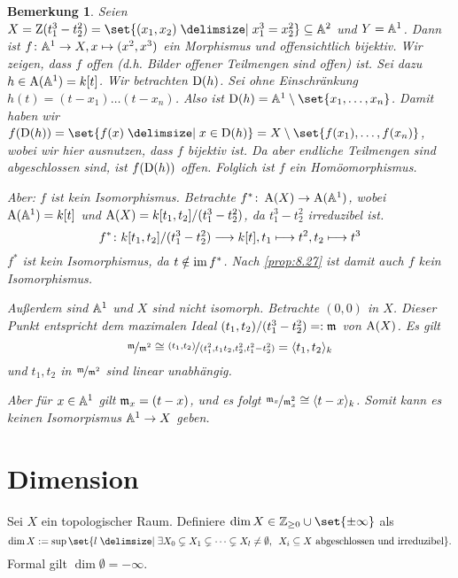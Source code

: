 \documentclass[12pt,a4paper]{scrartcl}
\theoremstyle{cplain}
\theoremstyle{cdef}
\newtheorem{beme}[thmcounter]{Bemerkung}
\begin{document}
\begin{beme}
	Seien $X = \Z(t_1^3-t_2^2) = \set{(x_1,x_2)\given x_1^3 = x_2^2}\subseteq \IA^2$ und $Y = \mathbb A^1$. Dann ist $f\colon \mathbb A^1\to X, x\mapsto (x^2, x^3)$ ein Morphismus und offensichtlich bijektiv. Wir zeigen, dass $f$ offen (d.h. Bilder offener Teilmengen sind offen) ist. Sei dazu $h\in \operatorname{A}(\mathbb A^1) = k[t]$. Wir betrachten $\operatorname{D}(h)$. Sei ohne Einschränkung $h(t) = (t-x_1)\dots (t-x_n)$. Also ist $\D(h) = \IA^1\setminus\set{x_1,\dots, x_n}$. Damit haben wir $f(\D(h)) = \set{f(x)\given x\in \D(h)} = X\setminus\set{f(x_1),\dots, f(x_n)}$, wobei wir hier ausnutzen, dass $f$ bijektiv ist. Da aber endliche Teilmengen sind abgeschlossen sind, ist $f(\operatorname{D}(h))$ offen. Folglich ist $f$ ein Homöomorphismus.
	
	Aber: $f$ ist kein Isomorphismus. Betrachte $f^*\colon \operatorname{A}(X)\to \operatorname{A}(\mathbb A^1)$, wobei $\operatorname{A}(\mathbb A^1) = k[t]$ und $\operatorname{A}(X) = k[t_1,t_2]/(t_1^3-t_2^2)$, da $t_1^3-t_2^2$ irreduzibel ist.
	$$f^*\colon k[t_1,t_2]/(t_1^3-t_2^2) \longrightarrow k[t], t_1\longmapsto t^2, t_2\longmapsto t^3$$
	$f^*$ ist kein Isomorphismus, da $t\notin \operatorname{im} f^*$. Nach \cref{prop:8.27} ist damit auch $f$ kein Isomorphismus.
	
	Außerdem sind $\mathbb A^1$ und $X$ sind nicht isomorph. Betrachte $(0,0)$ in $X$. Dieser Punkt entspricht dem maximalen Ideal $(t_1,t_2)/(t_1^3-t_2^2) =: \mathfrak{m}$ von $\operatorname{A}(X)$. Es gilt
	\[\nicefrac{\mathfrak{m}}{\mathfrak{m}^2} \cong \nicefrac{(t_1,t_2)}{(t_1^2, t_1t_2, t_2^2, t_1^2-t_2^2)} = \langle t_1,t_2\rangle_k \]
	und $t_1, t_2$ in $\nicefrac{\mathfrak{m}}{\mathfrak{m}^2}$ sind linear unabhängig.
	
	Aber für $x\in\mathbb A^1$ gilt $\mathfrak{m}_x = (t-x)$, und es folgt $\nicefrac{\mathfrak{m}_x}{\mathfrak{m}_x^2}\cong \langle t-x\rangle_k$. Somit kann es keinen Isomorpismus $\mathbb A^1\to X$ geben.
\end{beme}

\section{Dimension}
\begin{defi}
	Sei $X$ ein topologischer Raum. Definiere $\dim X \in \IZ_{\ge 0}\cup \set{\pm \infty}$ als 
	\[\dim X := \sup \set{l\given \exists X_0\subsetneq X_1\subsetneq\dots \subsetneq X_l \neq \emptyset,\enspace X_i\subseteq X\text{ abgeschlossen und irreduzibel}}.\]
	Formal gilt $\dim\emptyset = -\infty$.
\end{defi}

\medskip
\end{document}
